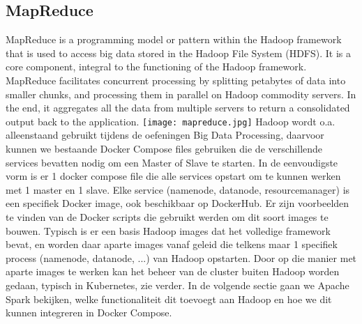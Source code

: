 \subsection{MapReduce}
MapReduce is a programming model or pattern within the Hadoop framework that is used to access big data stored in the Hadoop File System (HDFS). It is a core component, integral to the functioning of the Hadoop framework.
MapReduce facilitates concurrent processing by splitting petabytes of data into smaller chunks, and processing them in parallel on Hadoop commodity servers. In the end, it aggregates all the data from multiple servers to return a consolidated output back to the application.\autocite{Talend2023}
\newline
\texttt{[image: mapreduce.jpg]}
\newline
\newline
Hadoop wordt o.a. alleenstaand gebruikt tijdens de oefeningen Big Data Processing, daarvoor kunnen we bestaande Docker Compose files gebruiken die de verschillende services bevatten nodig om een Master of Slave te starten.
In de eenvoudigste vorm is er 1 docker compose file die alle services opstart om te kunnen werken met 1 master en 1 slave.
\newline
\newline
Elke service (namenode, datanode, resourcemanager) is een specifiek Docker image, ook beschikbaar op DockerHub. Er zijn voorbeelden te vinden van de Docker scripts die gebruikt werden om dit soort images te bouwen. Typisch is er een basis Hadoop images dat het volledige framework bevat, en worden daar aparte images vanaf geleid die telkens maar 1 specifiek process (namenode, datanode, ...) van Hadoop opstarten.
Door op die manier met aparte images te werken kan het beheer van de cluster buiten Hadoop worden gedaan, typisch in Kubernetes, zie verder.
\newline
\newline
In de volgende sectie gaan we Apache Spark bekijken, welke functionaliteit dit toevoegt aan Hadoop en hoe we dit kunnen integreren in Docker Compose.

